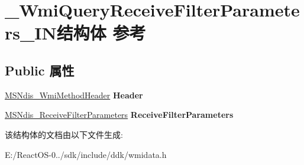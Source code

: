 \hypertarget{struct___wmi_query_receive_filter_parameters___i_n}{}\section{\+\_\+\+Wmi\+Query\+Receive\+Filter\+Parameters\+\_\+\+I\+N结构体 参考}
\label{struct___wmi_query_receive_filter_parameters___i_n}
\subsection*{Public 属性}
\begin{DoxyCompactItemize}
\item 
\mbox{\label{struct___wmi_query_receive_filter_parameters___i_n_a51b14d25a3ad830d09f5c9f7ff3d3703}} 
\hyperlink{struct___m_s_ndis___wmi_method_header}{M\+S\+Ndis\+\_\+\+Wmi\+Method\+Header} {\bfseries Header}
\item 
\mbox{\label{struct___wmi_query_receive_filter_parameters___i_n_af1e7a4bac689a8d90d587a415cb7690e}} 
\hyperlink{struct___m_s_ndis___receive_filter_parameters}{M\+S\+Ndis\+\_\+\+Receive\+Filter\+Parameters} {\bfseries Receive\+Filter\+Parameters}
\end{DoxyCompactItemize}


该结构体的文档由以下文件生成\+:\begin{DoxyCompactItemize}
\item 
E\+:/\+React\+O\+S-\/0../sdk/include/ddk/wmidata.\+h\end{DoxyCompactItemize}
